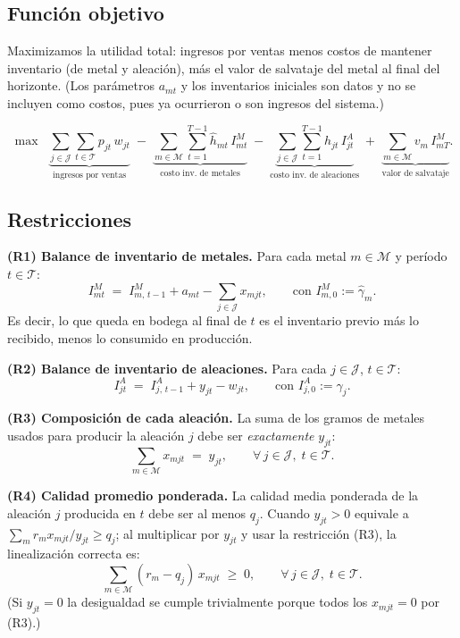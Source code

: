 \documentclass{article}
\begin{document}
\subsection*{Funci\'on objetivo}
Maximizamos la utilidad total: ingresos por ventas menos costos de mantener inventario (de metal y aleaci\'on), m\'as el valor de salvataje del metal al final del horizonte. (Los par\'ametros $a_{mt}$ y los inventarios iniciales son datos y no se incluyen como costos, pues ya ocurrieron o son ingresos del sistema.)

\[
\max\;\;
\underbrace{\sum_{j\in\mathcal{J}}\sum_{t\in\mathcal{T}} p_{jt}\, w_{jt}}_{\text{ingresos por ventas}}
\;-\;
\underbrace{\sum_{m\in\mathcal{M}}\sum_{t=1}^{T-1}\widehat{h}_{mt}\,I^{M}_{mt}}_{\text{costo inv. de metales}}
\;-\;
\underbrace{\sum_{j\in\mathcal{J}}\sum_{t=1}^{T-1} h_{jt}\,I^{A}_{jt}}_{\text{costo inv. de aleaciones}}
\;+\;
\underbrace{\sum_{m\in\mathcal{M}} v_m\,I^{M}_{mT}}_{\text{valor de salvataje}}.
\]

\subsection*{Restricciones}

\noindent\textbf{(R1) Balance de inventario de metales.} Para cada metal $m\in\mathcal{M}$ y per\'iodo $t\in\mathcal{T}$:
\[
I^{M}_{mt} \;=\; I^{M}_{m,\,t-1} + a_{mt} - \sum_{j\in\mathcal{J}} x_{mjt},
\qquad\text{con } I^{M}_{m,0} := \widehat{\gamma}_m.
\]
Es decir, lo que queda en bodega al final de $t$ es el inventario previo m\'as lo recibido, menos lo consumido en producci\'on.

\medskip
\noindent\textbf{(R2) Balance de inventario de aleaciones.} Para cada $j\in\mathcal{J}$, $t\in\mathcal{T}$:
\[
I^{A}_{jt} \;=\; I^{A}_{j,\,t-1} + y_{jt} - w_{jt},
\qquad\text{con } I^{A}_{j,0} := \gamma_j.
\]

\medskip
\noindent\textbf{(R3) Composici\'on de cada aleaci\'on.} La suma de los gramos de metales usados para producir la aleaci\'on $j$ debe ser \emph{exactamente} $y_{jt}$:
\[
\sum_{m\in\mathcal{M}} x_{mjt} \;=\; y_{jt}, \qquad \forall\, j\in\mathcal{J},\; t\in\mathcal{T}.
\]

\medskip
\noindent\textbf{(R4) Calidad promedio ponderada.} La calidad media ponderada de la aleaci\'on $j$ producida en $t$ debe ser al menos $q_j$. Cuando $y_{jt}>0$ equivale a $\sum_m r_m x_{mjt}/y_{jt} \geq q_j$; al multiplicar por $y_{jt}$ y usar la restricci\'on (R3), la linealizaci\'on correcta es:
\[
\sum_{m\in\mathcal{M}} (r_m - q_j)\,x_{mjt} \;\geq\; 0, \qquad \forall\, j\in\mathcal{J},\; t\in\mathcal{T}.
\]
(Si $y_{jt}=0$ la desigualdad se cumple trivialmente porque todos los $x_{mjt}=0$ por (R3).)
\end{document}
